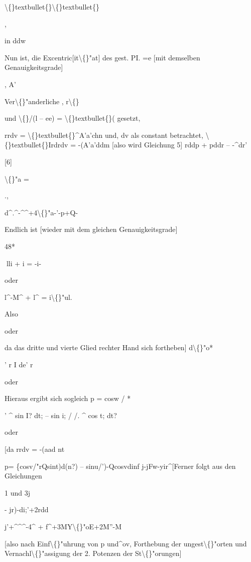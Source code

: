 \documentclass[10pt,a4paper]{article}
\begin{document}
\textbackslash\{\}textbullet\{\}\textbackslash\{\}textbullet\{\}

,

in ddw

Nun ist, die Excentric[it\textbackslash\{\}"at] des gest. PI. =e
[mit demselben Genauigkeitsgrade]

, A'

Ver\textbackslash\{\}"anderliche
, r\textbackslash\{\}

und \textbackslash\{\}/(l -- ee) = \textbackslash\{\}textbullet\{\}( gesetzt,

rrdv = \textbackslash\{\}textbullet\{\}\textasciicircum{}A'a'chn
und, dv als constant betrachtet,
\textbackslash\{\}textbullet\{\}Irdrdv = -(A'a'ddm
[also wird Gleichung 5]
rddp + pddr -- -\textasciicircum{}dr'

[6]

\textbackslash\{\}"a =

.,

d\textasciicircum{}.\textasciicircum{}-\textasciicircum{}\textasciicircum{}+4\textbackslash\{\}"a-'-p+Q-

Endlich ist [wieder mit dem gleichen Genauigkeitsgrade]

48*

\newpage
lli + i = -i-

oder

l\textasciicircum{}-M\textasciicircum{} + l\textasciicircum{} = i\textbackslash\{\}"ul.

Also

oder

da das dritte und vierte Glied rechter Hand sich fortheben]
d\textbackslash\{\}"o*

' r I de' r

oder

Hieraus ergibt sich sogleich
p = cosw /
*

' \textasciicircum{} sin I? dt; -- sin i; / /. \textasciicircum{} cos t; dt?

oder

[da rrdv = -(aad nt

p= \{cosv/"rQsint)d(n?) -- sinu/')-Qcosvdinf j-jFw-yir\textasciicircum{}[Ferner folgt aus den Gleichungen

1 und 3j

- jr)-di;'+2rdd

j'+\textasciicircum{}\textasciicircum{}\textasciicircum{}-4\textasciicircum{} + f\textasciicircum{}+3MY\textbackslash\{\}"oE+2M''-M

[also nach Einf\textbackslash\{\}"uhrung von p und\textasciicircum{}ov, Forthebung der ungest\textbackslash\{\}"orten
und Vernachl\textbackslash\{\}"assigung der 2. Potenzen der St\textbackslash\{\}"orungen]
\end{document}
